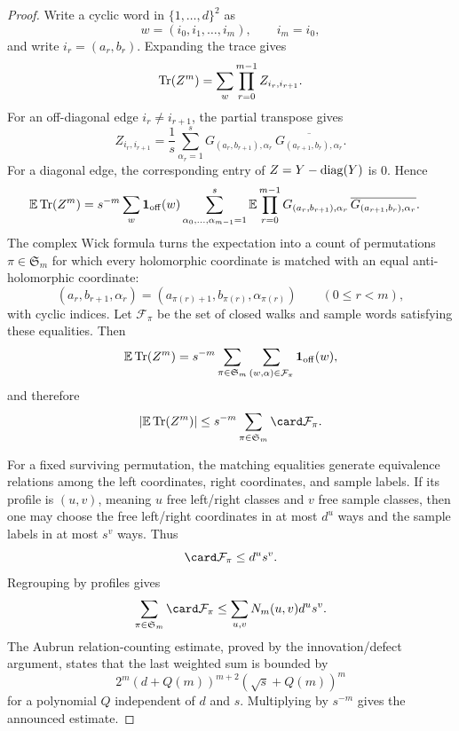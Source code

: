 \begin{proof}
Write a cyclic word in \(\{1,\ldots,d\}^2\) as
\[
    w=(i_0,i_1,\ldots,i_m),\qquad i_m=i_0,
\]
and write \(i_r=(a_r,b_r)\).  Expanding the trace gives
\[
    \operatorname{Tr}(Z^m)=\sum_w\prod_{r=0}^{m-1}Z_{i_r,i_{r+1}}.
\]
For an off-diagonal edge \(i_r\ne i_{r+1}\), the partial transpose gives
\[
    Z_{i_r,i_{r+1}}
    =
    \frac1s\sum_{\alpha_r=1}^s
    G_{(a_r,b_{r+1}),\alpha_r}\,
    \overline{G_{(a_{r+1},b_r),\alpha_r}}.
\]
For a diagonal edge, the corresponding entry of \(Z=Y-\operatorname{diag}(Y)\) is \(0\).
Hence
\[
\begin{aligned}
    \operatorname{\mathbb{E}}\operatorname{Tr}(Z^m)
    &=
    s^{-m}\sum_w\mathbf 1_{\mathrm{off}}(w)
    \sum_{\alpha_0,\ldots,\alpha_{m-1}=1}^s
    \operatorname{\mathbb{E}}\prod_{r=0}^{m-1}
    G_{(a_r,b_{r+1}),\alpha_r}\,
    \overline{G_{(a_{r+1},b_r),\alpha_r}} .
\end{aligned}
\]
The complex Wick formula turns the expectation into a count of permutations
\(\pi\in\mathfrak S_m\) for which every holomorphic coordinate is matched
with an equal anti-holomorphic coordinate:
\[
    (a_r,b_{r+1},\alpha_r)
    =
    (a_{\pi(r)+1},b_{\pi(r)},\alpha_{\pi(r)})
    \qquad(0\le r<m),
\]
with cyclic indices.  Let \(\mathcal F_\pi\) be the set of closed walks and
sample words satisfying these equalities.  Then
\[
    \operatorname{\mathbb{E}}\operatorname{Tr}(Z^m)
    =
    s^{-m}\sum_{\pi\in\mathfrak S_m}
    \sum_{(w,\alpha)\in\mathcal F_\pi}\mathbf 1_{\mathrm{off}}(w),
\]
and therefore
\[
    \left|\E\Tr(Z^m)\right|
    \le
    s^{-m}\sum_{\pi\in\mathfrak S_m}\card\mathcal F_\pi.
\]

For a fixed surviving permutation, the matching equalities generate
equivalence relations among the left coordinates, right coordinates, and
sample labels.  If its profile is \((u,v)\), meaning \(u\) free left/right
classes and \(v\) free sample classes, then one may choose the free
left/right coordinates in at most \(d^u\) ways and the sample labels in at
most \(s^v\) ways.  Thus
\[
    \card\mathcal F_\pi\le d^u s^v.
\]
Regrouping by profiles gives
\[
    \sum_{\pi\in\mathfrak S_m}\card\mathcal F_\pi
    \le
    \sum_{u,v}N_m(u,v)d^u s^v.
\]
The Aubrun relation-counting estimate, proved by the innovation/defect
argument, states that the last weighted sum is bounded by
\[
    2^m(d+Q(m))^{m+2}(\sqrt{s}+Q(m))^m
\]
for a polynomial \(Q\) independent of \(d\) and \(s\).  Multiplying by
\(s^{-m}\) gives the announced estimate.
\end{proof}

